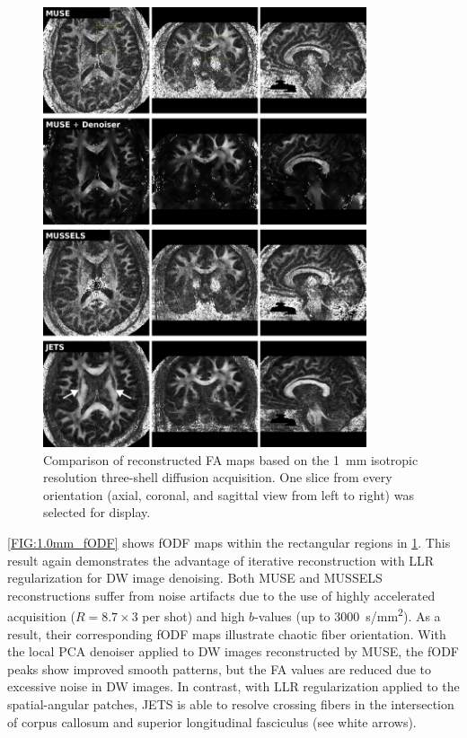 \documentclass[preprint,12pt,authoryear,review]{elsarticle}
\begin{document}
	\begin{figure}
		\centering
		\includegraphics[width=0.85\textwidth]{../figures/fig4.png}
		\caption{Comparison of reconstructed FA maps based on
            the \SI{1}{mm} isotropic resolution
		three-shell diffusion acquisition.
		One slice from every orientation
		(axial, coronal, and sagittal view from left to right)
		was selected for display.}
		\label{FIG:1.0mm_FA}
	\end{figure}

	\cref{FIG:1.0mm_fODF} shows fODF maps
        within the rectangular regions in \cref{FIG:1.0mm_FA}.
        This result again demonstrates
        the advantage of iterative reconstruction with LLR regularization
        for DW image denoising.
        Both MUSE and MUSSELS reconstructions suffer from noise artifacts due to
        the use of highly accelerated acquisition ($R = 8.7 \times 3$ per shot)
        and high $b$-values (up to \SI{3000}{s/mm^2}).
        As a result, their corresponding fODF maps illustrate chaotic fiber orientation.
        With the local PCA denoiser applied to DW images reconstructed by MUSE,
        the fODF peaks show improved smooth patterns, but the FA values are reduced
        due to excessive noise in DW images.
        In contrast, with LLR regularization applied to the spatial-angular patches,
        JETS is able to resolve crossing fibers in the intersection of corpus callosum
        and superior longitudinal fasciculus (see white arrows).
\end{document}
